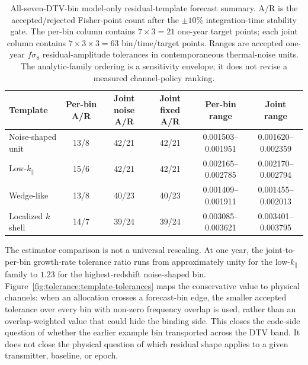\begin{table}[tbp]
\centering
\caption[All-bin analytic residual-template forecast]{All-seven-DTV-bin
model-only residual-template forecast summary.  A/R is the accepted/rejected
Fisher-point count after the $\pm10\%$ integration-time stability gate.  The
per-bin column contains $7\times3=21$ one-year target points; each joint column
contains $7\times3\times3=63$ bin/time/target points.  Ranges are accepted
one-year $f\sigma_8$ residual-amplitude tolerances in contemporaneous
thermal-noise units.  The analytic-family ordering is a sensitivity envelope;
it does not revise a measured channel-policy ranking.}
\label{tab:tolerance:template-comparison}
\footnotesize
\setlength{\tabcolsep}{4pt}
\begin{tabular}{@{}lccccc@{}}
\toprule
Template & Per-bin A/R & Joint noise A/R & Joint fixed A/R & Per-bin range & Joint range \\
\midrule
Noise-shaped unit & 13/8 & 42/21 & 42/21 & 0.001503--0.001951 & 0.001620--0.002359 \\
Low-$k_\parallel$ & 15/6 & 42/21 & 42/21 & 0.002165--0.002785 & 0.002170--0.002794 \\
Wedge-like & 13/8 & 40/23 & 40/23 & 0.001409--0.001911 & 0.001455--0.002013 \\
Localized $k$ shell & 14/7 & 39/24 & 39/24 & 0.003085--0.003621 & 0.003401--0.003795 \\
\bottomrule
\end{tabular}
\end{table}

The estimator comparison is not a universal rescaling.  At one year, the
joint-to-per-bin growth-rate tolerance ratio runs from approximately unity for
the low-$k_\parallel$ family to $1.23$ for the highest-redshift noise-shaped
bin.  Figure~\ref{fig:tolerance:template-tolerances} maps the conservative value to
physical channels: when an allocation crosses a forecast-bin edge, the smaller
accepted tolerance over every bin with non-zero frequency overlap is used,
rather than an overlap-weighted value that could hide the binding side.  This
closes the code-side question of whether the earlier example bin transported
across the DTV band.  It does not close the physical question of which residual
shape applies to a given transmitter, baseline, or epoch.

